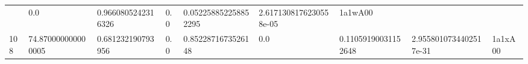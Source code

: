 \documentclass[11pt,a4paper,twoside]{book}
\theoremstyle{definition}
\theoremstyle{definition}
\theoremstyle{remark}
\begin{document}
\begin{longtable}[]{@{}lllllllll@{}}
\begin{minipage}[t]{0.04\columnwidth}
\end{minipage} & \begin{minipage}[t]{0.04\columnwidth}\raggedright\strut
0.0\strut
\end{minipage} & \begin{minipage}[t]{0.04\columnwidth}\raggedright\strut
0.9660805242316326\strut
\end{minipage} & \begin{minipage}[t]{0.04\columnwidth}\raggedright\strut
0.0\strut
\end{minipage} & \begin{minipage}[t]{0.04\columnwidth}\raggedright\strut
0.052258852258852295\strut
\end{minipage} & \begin{minipage}[t]{0.04\columnwidth}\raggedright\strut
2.6171308176230558e-05\strut
\end{minipage} & \begin{minipage}[t]{0.04\columnwidth}\raggedright\strut
1a1wA00\strut
\end{minipage}\tabularnewline
\begin{minipage}[t]{0.04\columnwidth}\raggedright\strut
108\strut
\end{minipage} & \begin{minipage}[t]{0.04\columnwidth}\raggedright\strut
74.870000000000005\strut
\end{minipage} & \begin{minipage}[t]{0.04\columnwidth}\raggedright\strut
0.681232190793956\strut
\end{minipage} & \begin{minipage}[t]{0.04\columnwidth}\raggedright\strut
0.0\strut
\end{minipage} & \begin{minipage}[t]{0.04\columnwidth}\raggedright\strut
0.8522871673526148\strut
\end{minipage} & \begin{minipage}[t]{0.04\columnwidth}\raggedright\strut
0.0\strut
\end{minipage} & \begin{minipage}[t]{0.04\columnwidth}\raggedright\strut
0.11059190031152648\strut
\end{minipage} & \begin{minipage}[t]{0.04\columnwidth}\raggedright\strut
2.9558010734402517e-31\strut
\end{minipage} & \begin{minipage}[t]{0.04\columnwidth}\raggedright\strut
1a1xA00\strut
\end{minipage}\tabularnewline

\end{longtable}
\end{document}
